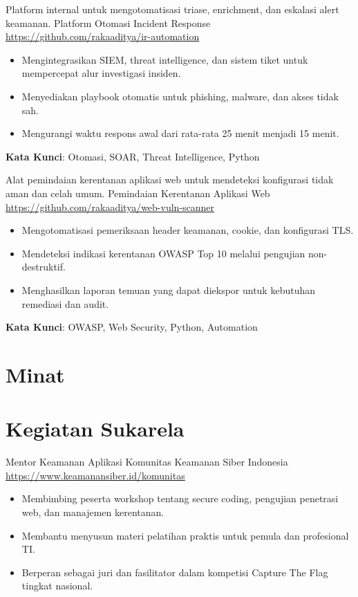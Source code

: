 \documentclass[a4paper, serif, 10pt]{moderncv}
\begin{document}
        {Platform internal untuk mengotomatisasi triase, enrichment, dan eskalasi alert keamanan.}
        {Platform Otomasi Incident Response}
        {\url{https://github.com/rakaaditya/ir-automation}}
        {}
        {\begin{itemize}
\item Mengintegrasikan SIEM, threat intelligence, dan sistem tiket untuk mempercepat alur investigasi insiden.
\item Menyediakan playbook otomatis untuk phishing, malware, dan akses tidak sah.
\item Mengurangi waktu respons awal dari rata-rata 25 menit menjadi 15 menit.
\end{itemize}
\textbf{Kata Kunci}: Otomasi, SOAR, Threat Intelligence, Python}

        {Alat pemindaian kerentanan aplikasi web untuk mendeteksi konfigurasi tidak aman dan celah umum.}
        {Pemindaian Kerentanan Aplikasi Web}
        {\url{https://github.com/rakaaditya/web-vuln-scanner}}
        {}
        {\begin{itemize}
\item Mengotomatisasi pemeriksaan header keamanan, cookie, dan konfigurasi TLS.
\item Mendeteksi indikasi kerentanan OWASP Top 10 melalui pengujian non-destruktif.
\item Menghasilkan laporan temuan yang dapat diekspor untuk kebutuhan remediasi dan audit.
\end{itemize}
\textbf{Kata Kunci}: OWASP, Web Security, Python, Automation}
\section{Minat}

\section{Kegiatan Sukarela}

        {Mentor Keamanan Aplikasi}
        {Komunitas Keamanan Siber Indonesia}
        {\url{https://www.keamanansiber.id/komunitas}}
        {}
        {\begin{itemize}
\item Membimbing peserta workshop tentang secure coding, pengujian penetrasi web, dan manajemen kerentanan.
\item Membantu menyusun materi pelatihan praktis untuk pemula dan profesional TI.
\item Berperan sebagai juri dan fasilitator dalam kompetisi Capture The Flag tingkat nasional.
\end{itemize}}
    
\end{document}
